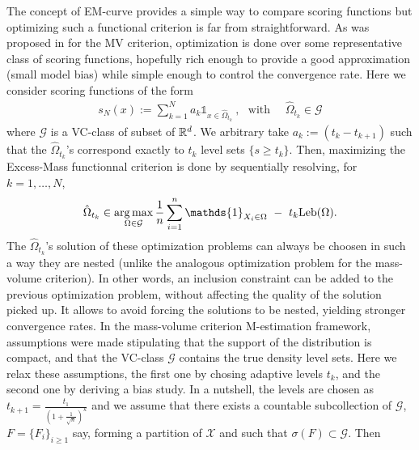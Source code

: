 The concept of EM-curve provides a simple way to compare scoring functions but optimizing such a functional criterion is far from straightforward. As was proposed in \cite{CLEM13} for the MV criterion,
optimization is done over some representative class of scoring functions, hopefully rich enough to provide a good approximation (small model bias) while simple enough to control the convergence rate. Here we consider scoring functions of the form
\begin{align*}
s_N(x):= \sum_{k=1}^N a_k \mathds{1}_{x \in \hat{\Omega}_{t_k} }~, ~~~\text{with ~~~} \hat{\Omega}_{t_k}  \in \mathcal{G}
\end{align*}
where $\mathcal{G}$ is a VC-class of subset of $\mathbb{R}^d$.
We arbitrary take $a_k:= (t_k-t_{k+1})$ such that the $\hat{\Omega}_{t_k}$'s correspond exactly to $t_k$ level sets $\{s \ge t_k\}$. Then, maximizing the Excess-Mass functionnal criterion is done by sequentially resolving, for $k=1,\ldots,N$,
\begin{align*}
\hat \Omega_{t_k} \in \argmax_{\Omega \in \mathcal{G}} \frac{1}{n}\sum_{i=1}^n\mathds{1}_{X_i \in \Omega}~-~t_k \leb(\Omega).
\end{align*}
The $\hat \Omega_{t_k}$'s solution of these optimization problems can always be choosen in such a way they are nested (unlike the analogous optimization problem for the mass-volume criterion). In other words, an inclusion constraint can be added to the previous optimization problem, without affecting the quality of the solution picked up. It allows to avoid forcing the solutions to be nested, yielding stronger convergence rates.
In the mass-volume criterion M-estimation framework, assumptions were made stipulating that the support of the distribution is compact, and that the VC-class $\mathcal{G}$ contains the true density level sets. Here we relax these assumptions, the first one by chosing adaptive levels $t_k$, and the second one by deriving a bias study. 
In a nutshell, the levels are chosen as $t_{k+1} =\frac{t_1}{(1+\frac{1}{\sqrt n})^{k}} $ and
we assume that there exists a countable subcollection of $\mathcal{G}$, $F=\{F_i\}_{i \ge 1}$ say, forming a partition of $\mathcal{X}$ and such that $\sigma (F) \subset \mathcal{G}$. Then
